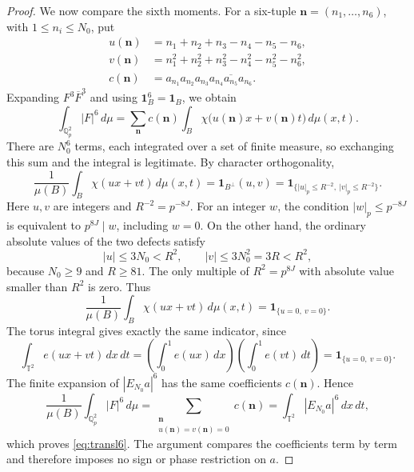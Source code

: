 \documentclass[11pt,twoside,a4paper]{article}
\numberwithin{equation}{section}
\theoremstyle{definition}
\newcommand{\Q}{\mathbb Q_p}
\newcommand{\T}{\mathbb T}
\newcommand{\one}{\mathbf 1}
\begin{document}
\begin{proof}
We now compare the sixth moments. For a six-tuple $\boldsymbol n=(n_1,\ldots,n_6)$, with $1\le n_i\le N_0$, put
$$
\begin{aligned}
u(\boldsymbol n)&=n_1+n_2+n_3-n_4-n_5-n_6,\\
v(\boldsymbol n)&=n_1^2+n_2^2+n_3^2-n_4^2-n_5^2-n_6^2,\\
c(\boldsymbol n)&=a_{n_1}a_{n_2}a_{n_3}
\overline{a_{n_4}a_{n_5}a_{n_6}}.
\end{aligned}
$$
Expanding $F^3\overline{F}^{3}$ and using $\one_B^6=\one_B$, we obtain
$$
\int_{\Q^2}|F|^6\,d\mu
=\sum_{\boldsymbol n}c(\boldsymbol n)
\int_B\chi\bigl(u(\boldsymbol n)x+v(\boldsymbol n)t\bigr)\,d\mu(x,t).
$$
There are $N_0^6$ terms, each integrated over a set of finite measure, so exchanging this sum and the integral is legitimate. By character orthogonality,
$$
\frac1{\mu(B)}\int_B\chi(ux+vt)\,d\mu(x,t)
=\one_{B^\perp}(u,v)
=\one_{\{|u|_p\le R^{-2},\ |v|_p\le R^{-2}\}}.
$$
Here $u,v$ are integers and $R^{-2}=p^{-8J}$. For an integer $w$, the condition $|w|_p\le p^{-8J}$ is equivalent to $p^{8J}\mid w$, including $w=0$. On the other hand, the ordinary absolute values of the two defects satisfy
$$
|u|\le3N_0<R^2,\qquad
|v|\le3N_0^2=3R<R^2,
$$
because $N_0\ge9$ and $R\ge81$. The only multiple of $R^2=p^{8J}$ with absolute value smaller than $R^2$ is zero. Thus
$$
\frac1{\mu(B)}\int_B\chi(ux+vt)\,d\mu(x,t)
=\one_{\{u=0,\ v=0\}}.
$$
The torus integral gives exactly the same indicator, since
$$
\int_{\T^2}e(ux+vt)\,dx\,dt
=\left(\int_0^1e(ux)\,dx\right)
\left(\int_0^1e(vt)\,dt\right)
=\one_{\{u=0,\ v=0\}}.
$$
The finite expansion of $|E_{N_0}a|^6$ has the same coefficients $c(\boldsymbol n)$. Hence
$$
\frac1{\mu(B)}\int_{\Q^2}|F|^6\,d\mu
=\sum_{\substack{\boldsymbol n\\u(\boldsymbol n)=v(\boldsymbol n)=0}}c(\boldsymbol n)
=\int_{\T^2}|E_{N_0}a|^6\,dx\,dt,
$$
which proves \eqref{eq:transl6}. The argument compares the coefficients term by term and therefore imposes no sign or phase restriction on $a$.
\end{proof}
\end{document}
